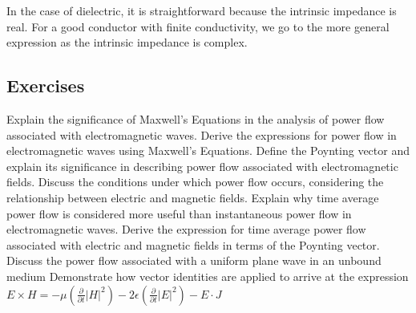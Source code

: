 In the case of dielectric, it is straightforward because the intrinsic impedance is real. For a good conductor with finite conductivity, we go to the more general expression as the intrinsic impedance is complex.
\begin{mdframed}[backgroundcolor=lightblue, linewidth=1pt,  hidealllines=true]
\section{Exercises}
\begin{ExerciseList}
	\Exercise[label={ex11}] Explain the significance of Maxwell's Equations in the analysis of power flow associated with electromagnetic waves.
	\Exercise[label={ex11}] Derive the expressions for power flow in electromagnetic waves using Maxwell's Equations.
    \Exercise[label={ex11}] Define the Poynting vector and explain its significance in describing power flow associated with electromagnetic fields.
	\Exercise[label={ex11}] Discuss the conditions under which power flow occurs, considering the relationship between electric and magnetic fields.
	\Exercise[label={ex11}] Explain why time average power flow is considered more useful than instantaneous power flow in electromagnetic waves.
	\Exercise[label={ex11}] Derive the expression for time average power flow associated with electric and magnetic fields in terms of the Poynting vector.
	\Exercise[label={ex11}] Discuss the power flow associated with a uniform plane wave in an unbound medium
	\Exercise[label={ex11}] Demonstrate how vector identities are applied to arrive at the expression 
	\(E \times H = -\mu\left(\frac{\partial}{\partial t} \lvert H \rvert^2\right) - 2\epsilon\left(\frac{\partial}{\partial t} \lvert E \rvert^2\right) - E \cdot J\)
	
	
\end{ExerciseList}
\end{mdframed}
